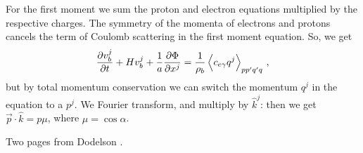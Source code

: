 \documentclass[main.tex]{subfiles}
\begin{document}
For the first moment we sum the proton and electron equations multiplied by the respective charges. 
The symmetry of the momenta of electrons and protons cancels the term of Coulomb scattering in the first moment equation. So, we get 
%
\begin{align}
\pdv{v^{j}_{b}}{t} + H v_b^{j} + \frac{1}{a} \pdv{\Phi }{x^{j}} 
=\frac{1}{\rho_{b}} \expval{c_{e \gamma } q^{j}}_{pp'q'q}
\,,
\end{align}
%
but by total momentum conservation we can switch the momentum \(q^{j} \) in the equation to a \(p^{j}\). 
We Fourier transform, and multiply by \(\hat{k}^{j}\): then we get \(\vec{p} \cdot \hat{k} = p \mu \), where \( \mu = \cos \alpha \). 

Two pages from Dodelson \cite[]{dodelsonModernCosmology2003}.


\end{document}
